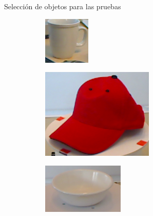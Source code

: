 \documentclass[]{beamer}
\begin{document}
\begin{frame}{Selección de objetos para las pruebas}
    \begin{figure}
        \centering
        \begin{subfigure}{0.3\textwidth}
            \centering
            \includegraphics[scale=0.8]{img/templates/coffee_mug_5.png}
        \end{subfigure}
        \begin{subfigure}{0.3\textwidth}
            \centering
            \includegraphics[scale=0.4]{img/templates/0_crop.png}
        \end{subfigure}
        \begin{subfigure}{0.3\textwidth}
            \centering
            \includegraphics[scale=0.6]{img/templates/bowl.png}
        \end{subfigure}


\end{figure}
\end{frame}
\end{document}
